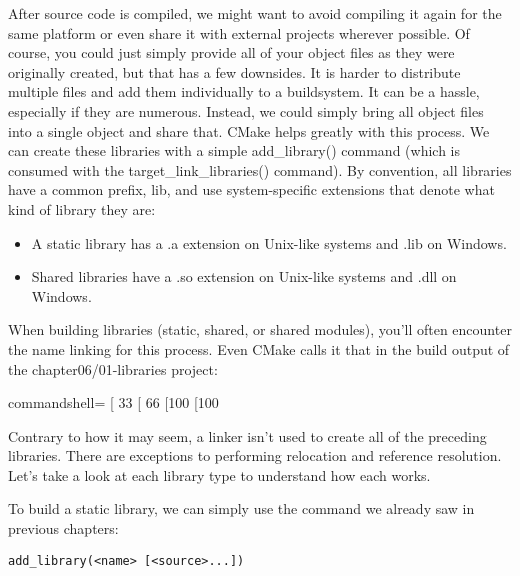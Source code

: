 
After source code is compiled, we might want to avoid compiling it again for the same platform or even share it with external projects wherever possible. Of course, you could just simply provide all of your object files as they were originally created, but that has a few downsides. It is harder to distribute multiple files and add them individually to a buildsystem. It can be a hassle, especially if they are numerous. Instead, we could simply bring all object files into a single object and share that. CMake helps greatly with this process. We can create these libraries with a simple add\_library() command (which is consumed with the target\_link\_libraries() command). By convention, all libraries have a common prefix, lib, and use system-specific extensions that denote what kind of library they are:

\begin{itemize}
\item 
A static library has a .a extension on Unix-like systems and .lib on Windows.

\item 
Shared libraries have a .so extension on Unix-like systems and .dll on Windows.
\end{itemize}

When building libraries (static, shared, or shared modules), you'll often encounter the name linking for this process. Even CMake calls it that in the build output of the chapter06/01-libraries project:

\begin{tcblisting}{commandshell={}}
[ 33%
[ 66%
[100%
[100%
\end{tcblisting}

Contrary to how it may seem, a linker isn't used to create all of the preceding libraries. There are exceptions to performing relocation and reference resolution. Let's take a look at each library type to understand how each works.


To build a static library, we can simply use the command we already saw in previous chapters:

\begin{lstlisting}[style=styleCMake]
add_library(<name> [<source>...])
\end{lstlisting}

